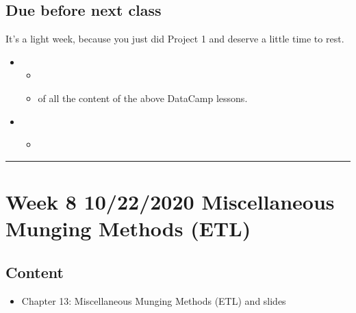 \documentclass[letterpaper,10pt,english]{sphinxmanual}
\begin{document}
\subsection{Due before next class}
\label{\detokenize{course-schedule:id12}}
It’s a light week, because you just did Project 1 and deserve a little time to rest.
\begin{itemize}
\item {} 
\begin{itemize}
\item {} 

\item {} 
 of all the content of the above DataCamp lessons.

\end{itemize}

\item {} 
\begin{itemize}
\item {} 
{\hyperref[\detokenize{chapter-13-etl::doc}]{}}

\end{itemize}

\end{itemize}


\bigskip\hrule\bigskip



\section{Week 8 \sphinxhyphen{} 10/22/2020 \sphinxhyphen{} Miscellaneous Munging Methods (ETL)}
\label{\detokenize{course-schedule:week-8-10-22-2020-miscellaneous-munging-methods-etl}}

\subsection{Content}
\label{\detokenize{course-schedule:id13}}\begin{itemize}
\item {} 
Chapter 13: Miscellaneous Munging Methods (ETL) \sphinxhyphen{} {\hyperref[\detokenize{chapter-13-etl::doc}]{}} and slides

\end{itemize}
\end{document}
